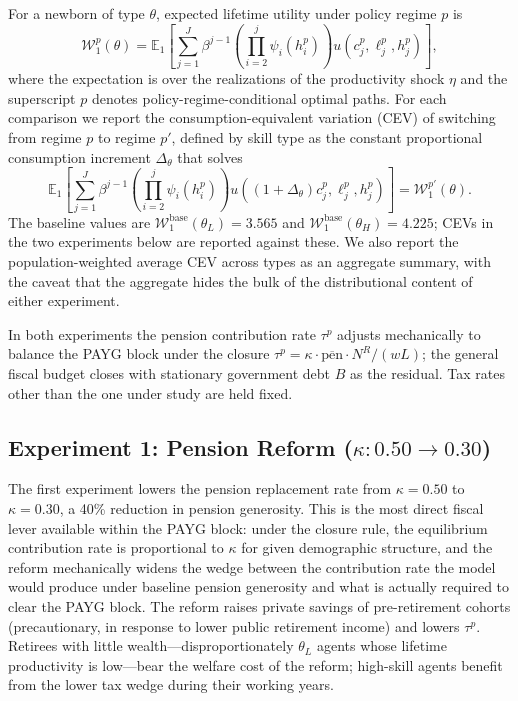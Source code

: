 \documentclass[12pt,a4paper]{article}
\begin{document}
For a newborn of type $\theta$, expected lifetime utility under
policy regime $p$ is
\begin{equation}
\label{eq:welfare_newborn}
\mathcal{W}^{p}_{1}(\theta)
= \mathbb{E}_{1}\!\left[\sum_{j=1}^{J} \beta^{j-1}
\left(\prod_{i=2}^{j} \psi_{i}(h_{i}^{p})\right)
u\!\left(c_{j}^{p}, \ell_{j}^{p}, h_{j}^{p}\right)\right],
\end{equation}
where the expectation is over the realizations of the productivity
shock $\eta$ and the superscript $p$ denotes
policy-regime-conditional optimal paths. For each comparison we
report the consumption-equivalent variation (CEV) of switching from
regime $p$ to regime $p'$, defined by skill type as the constant
proportional consumption increment $\Delta_{\theta}$ that solves
\begin{equation}
\label{eq:cev_newborn}
\mathbb{E}_{1}\!\left[\sum_{j=1}^{J} \beta^{j-1}
\left(\prod_{i=2}^{j} \psi_{i}(h_{i}^{p})\right)
u\!\left((1 + \Delta_{\theta}) c_{j}^{p}, \ell_{j}^{p}, h_{j}^{p}\right)\right]
= \mathcal{W}^{p'}_{1}(\theta).
\end{equation}
The baseline values are
$\mathcal{W}^{\text{base}}_{1}(\theta_{L}) = 3.565$ and
$\mathcal{W}^{\text{base}}_{1}(\theta_{H}) = 4.225$; CEVs in the two
experiments below are reported against these. We also report the
population-weighted average CEV across types as an aggregate summary,
with the caveat that the aggregate hides the bulk of the
distributional content of either experiment.

In both experiments the pension contribution rate $\tau^{p}$ adjusts
mechanically to balance the PAYG block under the closure
$\tau^{p} = \kappa \cdot \overline{\text{pen}} \cdot N^{R} / (w L)$;
the general fiscal budget closes with stationary government debt $B$
as the residual. Tax rates other than the one under study are held
fixed.

\subsection{Experiment 1: Pension Reform ($\kappa: 0.50 \to 0.30$)}
\label{subsec:exp_kappa}

The first experiment lowers the pension replacement rate from
$\kappa = 0.50$ to $\kappa = 0.30$, a 40\% reduction in pension
generosity. This is the most direct fiscal lever available within
the PAYG block: under the closure rule, the equilibrium contribution
rate is proportional to $\kappa$ for given demographic structure,
and the reform mechanically widens the wedge between the
contribution rate the model would produce under baseline pension
generosity and what is actually required to clear the PAYG block.
The reform raises private savings of pre-retirement cohorts
(precautionary, in response to lower public retirement income) and
lowers $\tau^{p}$. Retirees with little wealth---disproportionately
$\theta_{L}$ agents whose lifetime productivity is low---bear the
welfare cost of the reform; high-skill agents benefit from the lower
tax wedge during their working years.
\end{document}
